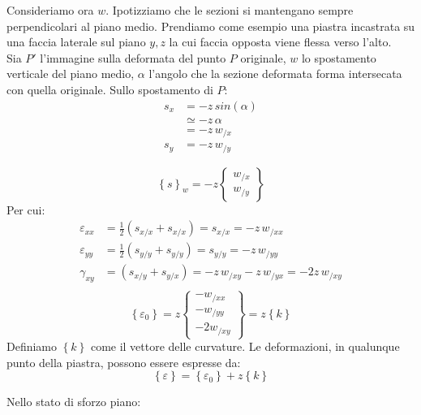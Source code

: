 Consideriamo ora $w$. Ipotizziamo che le sezioni si mantengano sempre perpendicolari al piano medio. Prendiamo come esempio una piastra incastrata su una faccia laterale sul piano $y,z$ la cui faccia opposta viene flessa verso l'alto.\\
Sia $P'$ l'immagine sulla deformata del punto $P$ originale, $w$ lo spostamento verticale del piano medio, $\alpha$ l'angolo che la sezione deformata forma intersecata con quella originale. Sullo spostamento di $P$:
\begin{align*}
    s_x&=-z\,sin(\alpha)\\&\simeq-z\,\alpha\\&=-z\,w_{/x}\\
    s_y&=-z\,w_{/y}
\end{align*}

\begin{equation*}
    \left\{s
\right\}_{w}=-z\left\{
\begin{array}{c}
w_{/x} \\
w_{/y}
\end{array}
\right\}
\end{equation*}
Per cui:
\begin{align*}
    \varepsilon_{xx}&=\frac{1}{2}(s_{x/x}+s_{x/x})=s_{x/x}=-z\,w_{/xx}\\
     \varepsilon_{yy}&=\frac{1}{2}(s_{y/y}+s_{y/y})=s_{y/y}=-z\,w_{/yy}\\
      \gamma_{xy}&=(s_{x/y}+s_{y/x})=-z\,w_{/xy}-z\,w_{/yx}=-2z\,w_{/xy}\\
\end{align*}
\begin{equation*}
    \left\{\varepsilon_0
\right\}=z\left\{
\begin{array}{c}
-w_{/xx}\\
-w_{/yy}\\  -2w_{/xy}
\end{array}
\right\}
=z\left\{ k\right\}
\end{equation*}
Definiamo $\left\{ k\right\}$ come il vettore delle curvature. Le deformazioni, in qualunque punto della piastra, possono essere espresse da:
\begin{equation*}
    \left\{ \varepsilon\right\}=\left\{ \varepsilon_0\right\}+z\left\{ k\right\}
\end{equation*}

Nello stato di sforzo piano:

